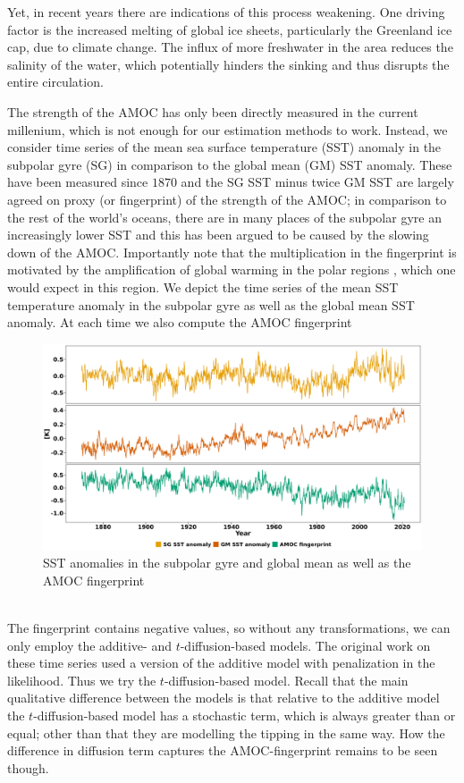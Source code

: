 Yet, in recent years there are indications of this process weakening. One driving factor is the increased melting of global ice sheets, particularly the Greenland ice cap, due to climate change. The influx of more freshwater in the area reduces the salinity of the water, which potentially hinders the sinking and thus disrupts the entire circulation. 

The strength of the AMOC has only been directly measured in the current millenium, which is not enough for our estimation methods to work. Instead, we consider time series of the mean sea surface temperature (SST) anomaly in the subpolar gyre (SG) in comparison to the global mean (GM) SST anomaly. These have been measured since $1870$ and the SG SST minus twice GM SST are largely agreed on proxy (or fingerprint) of the strength of the AMOC; in comparison to the rest of the world's oceans, there are in many places of the subpolar gyre an increasingly lower SST and this has been argued to be caused by the slowing down of the AMOC. Importantly note that the multiplication in the fingerprint is motivated by the amplification of global warming in the polar regions \cite[caption of Figure 1]{Ditlevsen2023}, which one would expect in this region.
\noindent We depict the time series of the mean SST temperature anomaly in the subpolar gyre as well as the global mean SST anomaly. At each time we also compute the AMOC fingerprint
\begin{figure}[h!]
    \begin{center}
    \includegraphics[scale = .06]{figures/AMOC_data_plot.jpeg}
    \caption{SST anomalies in the subpolar gyre and global mean as well as the AMOC fingerprint}
    \label{figure:AMOC_plot}
    \end{center}
\end{figure}\\
The fingerprint contains negative values, so without any transformations, we can only employ the additive- and $t$-diffusion-based models. The original work on these time series \cite{Ditlevsen2023} used a version of the additive model with penalization in the likelihood. Thus we try the $t$-diffusion-based model. Recall that the main qualitative difference between the models is that relative to the additive model the $t$-diffusion-based model has a stochastic term, which is always greater than or equal; other than that they are modelling the tipping in the same way. How the difference in diffusion term captures the AMOC-fingerprint remains to be seen though.
